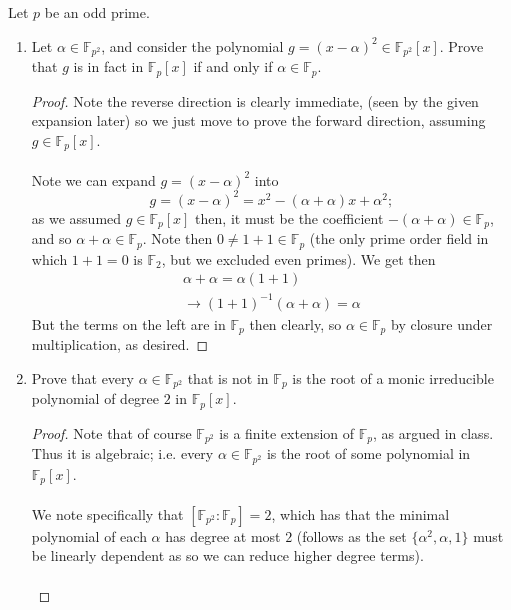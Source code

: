 \documentclass[12pt]{article}
\newenvironment{ex}[2][Exercise]{\begin{trivlist}
\item[\hskip \labelsep {\bfseries #1}\hskip \labelsep {\bfseries #2.}]}{\end{trivlist}}
\begin{document}
\begin{ex}{4}
    Let $p$ be an odd prime. 
    \begin{enumerate}[label=(\alph*)]
        \item Let $\alpha \in \mathbb{F}_{p^2}$, and consider the polynomial $g = (x - \alpha)^2 \in \mathbb{F}_{p^2}[x]$. Prove that $g$ is in fact in $\mathbb{F}_{p}[x]$ if and only if $\alpha \in \mathbb{F}_p$. 
        \begin{proof}
            Note the reverse direction is clearly immediate, (seen by the given expansion later) so we just move to prove the forward direction, assuming $g \in \mathbb{F}_p[x]$. \\ \\
            Note we can expand $g = (x - \alpha)^2$ into 
            $$g = (x - \alpha)^2 = x^2 - (\alpha + \alpha)x + \alpha^2;$$
            as we assumed $g \in \mathbb{F}_p[x]$ then, it must be the coefficient $-(\alpha + \alpha) \in \mathbb{F}_p$, and so $\alpha + \alpha \in \mathbb{F}_p$. Note then $0 \neq 1 + 1 \in \mathbb{F}_p$ (the only prime order field in which $1 + 1 = 0$ is $\mathbb{F}_2$, but we excluded even primes). We get then 
            \begin{align*}
                \alpha + \alpha = \alpha(1 + 1) \\ 
                \rightarrow (1 + 1)^{-1}(\alpha + \alpha) = \alpha
            \end{align*}
            But the terms on the left are in $\mathbb{F}_p$ then clearly, so $\alpha \in \mathbb{F}_p$ by closure under multiplication, as desired.
        \end{proof}
        \item Prove that every $\alpha \in \mathbb{F}_{p^2}$ that is not in $\mathbb{F}_p$ is the root of a monic irreducible polynomial of degree $2$ in $\mathbb{F}_p[x]$. 
        \begin{proof}
            Note that of course $\mathbb{F}_{p^2}$ is a finite extension of $\mathbb{F}_p$, as argued in class. Thus it is algebraic; i.e. every $\alpha \in \mathbb{F}_{p^2}$ is the root of some polynomial in $\mathbb{F}_p[x]$. \\ \\
            We note specifically that $[\mathbb{F}_{p^2} : \mathbb{F}_{p}] = 2$, which has that the minimal polynomial of each $\alpha$ has degree at most $2$ (follows as the set $\{\alpha^2, \alpha, 1\}$ must be linearly dependent as so we can reduce higher degree terms). \\ \\

\end{proof}
\end{enumerate}
\end{ex}
\end{document}
